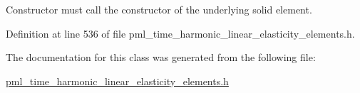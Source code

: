 Constructor must call the constructor of the underlying solid element. 



Definition at line 536 of file pml\+\_\+time\+\_\+harmonic\+\_\+linear\+\_\+elasticity\+\_\+elements.\+h.



The documentation for this class was generated from the following file\+:\begin{DoxyCompactItemize}
\item 
\hyperlink{pml__time__harmonic__linear__elasticity__elements_8h}{pml\+\_\+time\+\_\+harmonic\+\_\+linear\+\_\+elasticity\+\_\+elements.\+h}\end{DoxyCompactItemize}
